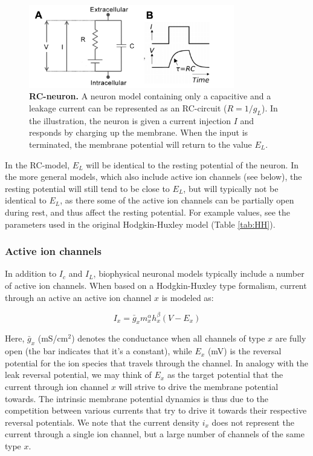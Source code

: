 \begin{figure}[!ht]
\begin{center}
\includegraphics[width=0.8\textwidth]{Fig02/RCneuron.png}
\end{center}
\caption{\textbf{RC-neuron.}  A neuron model containing only a capacitive and a leakage current can be represented as an RC-circuit ($R = 1/g_L$). In the illustration, the neuron is given a current injection $I$ and responds by charging up the membrane. When the input is terminated, the membrane potential will return to the value $E_L$.
}
\label{fig:RC}
\end{figure}

In the RC-model, $E_L$ will be identical to the resting potential of the neuron. In the more general models, which also include active ion channels (see below), the resting potential will still tend to be close to $E_L$, but will typically not be identical to $E_L$, as there some of the active ion channels can be partially open during rest, and thus affect the resting potential. For example values, see the parameters used in the original Hodgkin-Huxley model (Table \ref{tab:HH}).

\subsubsection{Active ion channels}
In addition to $I_c$ and $I_L$, biophysical neuronal models typically include a number of active ion channels. When based on a Hodgkin-Huxley type formalism, current through an active an active ion channel $x$ is modeled as:

\begin{equation}
I_x = \bar{g}_x m_x^{\alpha} h_x^{\beta}(V-E_x)
\label{eq:HHform}
\end{equation}

Here, $\bar{g}_x$ (mS/cm$^2$) denotes the conductance when all channels of type $x$ are fully open (the bar indicates that it's a constant), while $E_x$ (mV) is the reversal potential for the ion species that travels through the channel. In analogy with the leak reversal potential, we may think of $E_x$ as the target potential that the current through ion channel $x$ will strive to drive the membrane potential towards. The intrinsic membrane potential dynamics is thus due to the competition between various currents that try to drive it towards their respective reversal potentials. We note that the current density $i_x$ does not represent the current through a single ion channel, but a large number of channels of the same type $x$. 

